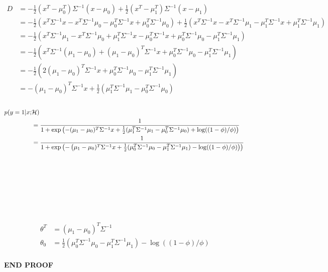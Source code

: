 \begin{align*}
D &= -\frac{1}{2}(x^T-\mu_{0}^T) \Sigma^{-1} (x-\mu_{0})
		+ \frac{1}{2}(x^T-\mu_1^T) \Sigma^{-1} (x-\mu_1) \\
	&= -\frac{1}{2}(x^T\Sigma^{-1}x -x^T\Sigma^{-1}\mu_{0}
			-\mu_{0}^T\Sigma^{-1}x + \mu_{0}^T\Sigma^{-1}\mu_{0})
			+ \frac{1}{2}(x^T\Sigma^{-1}x -x^T\Sigma^{-1}\mu_{1}
			-\mu_{1}^T\Sigma^{-1}x + \mu_{1}^T\Sigma^{-1}\mu_{1})
			\\
	&= -\frac{1}{2}(x^T\Sigma^{-1}\mu_{1} - x^T\Sigma^{-1}\mu_{0}
		+\mu_{1}^T\Sigma^{-1}x - \mu_{0}^T\Sigma^{-1}x
		+ \mu_{0}^T\Sigma^{-1}\mu_{0} - \mu_{1}^T\Sigma^{-1}\mu_{1})\\
	&= -\frac{1}{2}(x^T\Sigma^{-1}(\mu_{1}-\mu_{0})
		+ (\mu_{1}-\mu_{0})^T\Sigma^{-1}x
		+ \mu_{0}^T\Sigma^{-1}\mu_{0} - \mu_{1}^T\Sigma^{-1}\mu_{1}
		) \\
	&= -\frac{1}{2}(2(\mu_{1}-\mu_{0})^T\Sigma^{-1}x
		+ \mu_{0}^T\Sigma^{-1}\mu_{0} - \mu_{1}^T\Sigma^{-1}\mu_{1}
		) \\ 
	&= -(\mu_{1}-\mu_{0})^T\Sigma^{-1}x
		+ \frac{1}{2}(\mu_{1}^T\Sigma^{-1}\mu_{1} - \mu_{0}^T\Sigma^{-1}\mu_{0}
		)\\
	 &\\[100pt]
\end{align*}

\begin{align*}
p(y =1| x ; & \mathcal{H})\\
	&= \frac{1} {1+ 
		\exp\left(-(\mu_{1}-\mu_{0})^T\Sigma^{-1}x
		+ \frac{1}{2}(\mu_{1}^T\Sigma^{-1}\mu_{1} - \mu_{0}^T\Sigma^{-1}\mu_{0}) +\log((1-\phi)/\phi)
		\right) 
		}\\
	&= \frac{1} {1+ 
		\exp\left(-\left(\mu_{1}-\mu_{0})^T\Sigma^{-1}x
		+ \frac{1}{2}(\mu_{0}^T\Sigma^{-1}\mu_{0} - \mu_{1}^T\Sigma^{-1}\mu_{1}) -\log((1-\phi)/\phi)\right)
		\right) 
		}
	&
	 &\\[100pt]
\end{align*}

\begin{align*}
\theta^T &= (\mu_{1}-\mu_{0})^T\Sigma^{-1} \\
\theta_0 &= \frac{1}{2}(\mu_{0}^T\Sigma^{-1}\mu_{0} - \mu_{1}^T\Sigma^{-1}\mu_{1}) -\log((1-\phi)/\phi) 
	&
	 &\\[100pt]
\end{align*}

{\bf END PROOF}\\